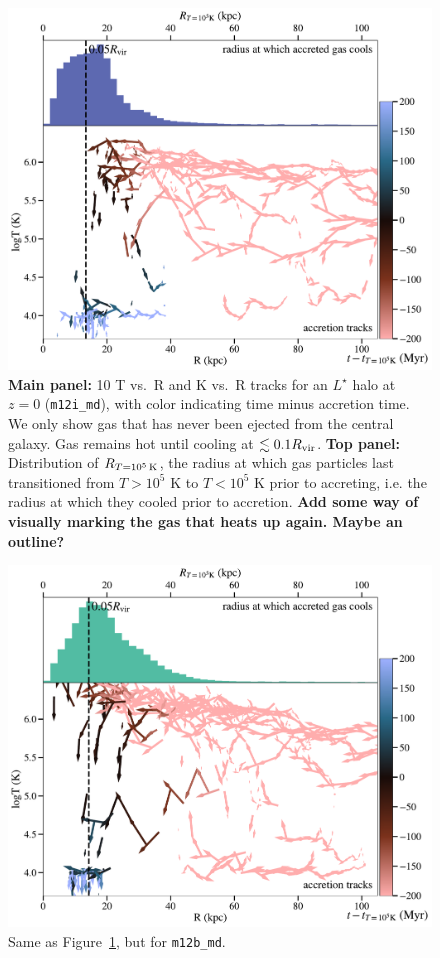 \documentclass[fleqn,usenatbib]{mnras}
\newcommand{\Rcool}{R_{T=10^5\,{\rm K}}}
\begin{document}
\begin{figure}
    \centering
    \includegraphics[width=\columnwidth]{figures/tracks_m12i_md.pdf}
    \caption{
    \textbf{Main panel:} 10 T vs.\ R and K vs.\ R tracks for an $L^\star$ halo at $z=0$ (\texttt{m12i\_md}), with color indicating time minus accretion time.
    We only show gas that has never been ejected from the central galaxy.
    Gas remains hot until cooling at $\lesssim 0.1 R_{\rm vir}$.
    \textbf{Top panel:} Distribution of $\Rcool$, the radius at which gas particles last transitioned from $T > 10^5$ K to $T < 10^5$ K prior to accreting, i.e. the radius at which they cooled prior to accretion.
    \textbf{Add some way of visually marking the gas that heats up again. Maybe an outline?}
    }
    \label{f: T vs R}
\end{figure}

\begin{figure}
    \centering
    \includegraphics[width=\columnwidth]{figures/tracks_m12b_md.pdf}
    \caption{
    Same as Figure~\ref{f: T vs R}, but for \texttt{m12b\_md}.
    }
    \label{f: T vs R m12b_md}
\end{figure}
\end{document}
